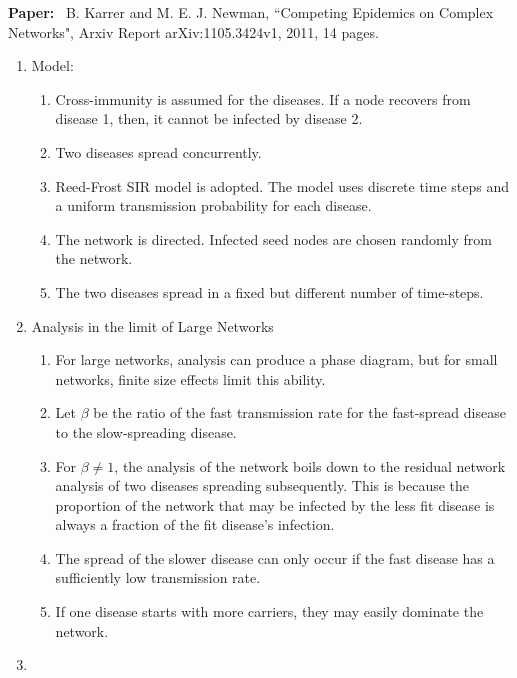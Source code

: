 \documentclass[11pt]{article}
\begin{document}
\clearpage

\noindent
\textbf{Paper:}~ 
B. Karrer and M. E. J. Newman, ``Competing Epidemics on Complex Networks",
Arxiv Report arXiv:1105.3424v1, 2011, 14 pages.

\begin{enumerate}
    
    \item Model: \begin{enumerate}
        \item Cross-immunity is assumed for the diseases. If a node 
        recovers from disease 1, then, it cannot be infected by disease 2.
        
        \item Two diseases spread concurrently.
        
        \item Reed-Frost SIR model is adopted. The model uses discrete time steps and a uniform transmission probability for each disease.
        
        \item The network is directed. Infected seed nodes
        are chosen randomly from the network. 
        
        \item The two diseases spread in a fixed but different
        number of time-steps.
    \end{enumerate}
    
    \item Analysis in the limit of Large Networks
    \begin{enumerate}
        
        \item For large networks, analysis can produce a phase diagram, but for small networks, finite size effects limit this ability.
        
        \item Let $\beta$ be the ratio of the fast transmission rate for the fast-spread disease to the slow-spreading disease.
        
        \item For $\beta \neq 1$, the analysis of the network boils down to the residual network analysis of two diseases spreading subsequently. This is because the proportion of the network that may be infected by the less fit disease is always a fraction of the fit disease's infection.
        
        \item The spread of the slower disease can only occur if the fast disease has a sufficiently low transmission rate.
        
        \item If one disease starts with more carriers, 
        they may easily dominate the network.
    \end{enumerate}
    \item  
    
\end{enumerate}
\end{document}
